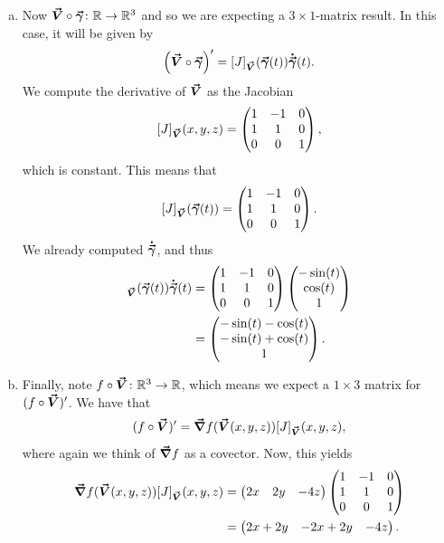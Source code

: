 \documentclass[12pt]{article} %
\begin{document}
\begin{solution}
\begin{enumerate}[(a)]
        \item Now $\boldsymbol{\vec{V}} \circ \boldsymbol{\vec{\gamma}} \colon \mathbb{R} \to \mathbb{R}^3$ and so we are expecting a $3\times 1$-matrix result.  In this case, it will be given by
        \[
        \left( \boldsymbol{\vec{V}} \circ \boldsymbol{\vec{\gamma}}\right)' = [J]_{\boldsymbol{\vec{V}}}(\boldsymbol{\vec{\gamma}}(t))\boldsymbol{\dot{\vec{\gamma}}}(t).
        \]
        We compute the derivative of $\boldsymbol{\vec{V}}$ as the Jacobian
        \[
        [J]_{\boldsymbol{\vec{V}}}(x,y,z) = \begin{pmatrix} 1 & -1 & 0 \\ 1 & 1 & 0 \\ 0 & 0 & 1 \end{pmatrix},
        \]
        which is constant. This means that
        \[
        [J]_{\boldsymbol{\vec{V}}}(\boldsymbol{\vec{\gamma}}(t)) = \begin{pmatrix} 1 & -1 & 0 \\ 1 & 1 & 0 \\ 0 & 0 & 1 \end{pmatrix}.
        \]
        We already computed $\boldsymbol{\dot{\vec{\gamma}}}$, and thus
        \begin{align*}
        [J]_{\vecfieldV}(\curvegamma(t))\tangentgamma(t) &= \begin{pmatrix} 1 & -1 & 0 \\ 1 & 1 & 0 \\ 0 & 0 & 1 \end{pmatrix}\begin{pmatrix} -\sin(t) \\ \cos(t) \\ 1 \end{pmatrix} \\
        &= \begin{pmatrix} -\sin(t)-\cos(t) \\ -\sin(t) +\cos(t) \\ 1 \end{pmatrix}.
        \end{align*}
        
        \item Finally, note $f\circ \boldsymbol{\vec{V}} \colon \mathbb{R}^3 \to \mathbb{R}$, which means we expect a $1\times 3$ matrix for $(f\circ \boldsymbol{\vec{V}})'$.  We have that
        \[
        (f\circ \boldsymbol{\vec{V}})' = \boldsymbol{\vec{\nabla}} f(\boldsymbol{\vec{V}}(x,y,z)) [J]_{\boldsymbol{\vec{V}}}(x,y,z),
        \]
        where again we think of $\boldsymbol{\vec{\nabla}} f$ as a covector.  Now, this yields
        \begin{align*}
        \boldsymbol{\vec{\nabla}} f(\boldsymbol{\vec{V}}(x,y,z)) [J]_{\boldsymbol{\vec{V}}}(x,y,z) &= \begin{pmatrix} 2x & 2y & -4z \end{pmatrix} \begin{pmatrix} 1 & -1 & 0 \\ 1 & 1 & 0 \\ 0 & 0 & 1 \end{pmatrix}\\
        &= \begin{pmatrix} 2x+2y & -2x +2y & -4z \end{pmatrix}.
        \end{align*}
    \end{enumerate}
    
\end{solution}
\end{document}

